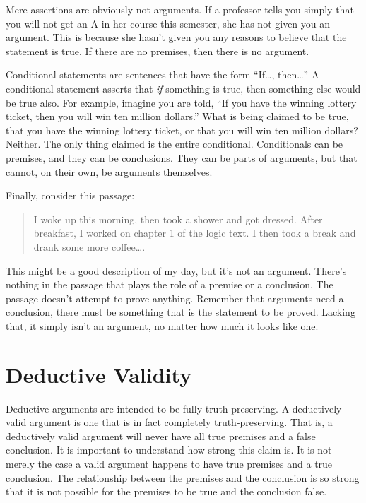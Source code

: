 \documentclass[../logic-text.tex]{subfiles}
\begin{document}
Mere assertions are obviously not arguments. If a professor tells you simply that you will not get an A in her course this semester, she has not given you an argument. This is because she hasn't given you any reasons to believe that the statement is true. If there are no premises, then there is no argument.

Conditional statements are sentences that have the form \enquote{If\ldots, then\ldots} A conditional statement asserts that \emph{if} something is true, then something else would be true also. For example, imagine you are told, \enquote{If you have the winning lottery ticket, then you will win ten million dollars.} What is being claimed to be true, that you have the winning lottery ticket, or that you will win ten million dollars? Neither. The only thing claimed is the entire conditional. Conditionals can be premises, and they can be conclusions. They can be parts of arguments, but that cannot, on their own, be arguments themselves.

Finally, consider this passage:

\begin{quote}
I woke up this morning, then took a shower and got dressed. After breakfast, I worked on chapter 1 of the logic text. I then took a break and drank some more coffee\ldots.
\end{quote}

This might be a good description of my day, but it's not an argument. There's nothing in the passage that plays the role of a premise or a conclusion. The passage doesn't attempt to prove anything. Remember that arguments need a conclusion, there must be something that is the statement to be proved. Lacking that, it simply isn't an argument, no matter how much it looks like one.


\section{Deductive Validity}
\label{sec:deductive-validity}

Deductive arguments are intended to be fully truth-preserving. A deductively valid argument is one that is in fact completely truth-preserving. That is, a deductively valid argument will never have all true premises and a false conclusion. It is important to understand how strong this claim is. It is not merely the case a valid argument happens to have true premises and a true conclusion. The relationship between the premises and the conclusion is so strong that it is not possible for the premises to be true and the conclusion false.
\end{document}

